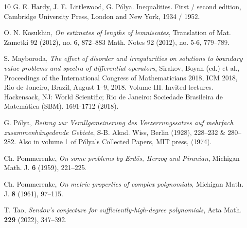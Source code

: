 \documentclass[12pt]{amsart}
\begin{document}
\begin{thebibliography}{10}
G. E. Hardy, J. E. Littlewood, G. P\'olya. Inequalities. First / second edition, Cambridge University Press, London and New York, 1934 / 1952.

O. N. Kosukhin, \emph{On estimates of lengths of lemniscates},
Translation of Mat. Zametki 92 (2012), no. 6, 872--883
Math. Notes 92 (2012), no. 5-6, 779--789.



S. Mayboroda, \emph{The effect of disorder and irregularities on solutions to boundary value problems and spectra of differential operators}, Sirakov, Boyan (ed.) et al., Proceedings of the International Congress of Mathematicians 2018, ICM 2018, Rio de Janeiro, Brazil, August 1--9, 2018. Volume III. Invited lectures. Hackensack, NJ: World Scientific; Rio de Janeiro: Sociedade Brasileira de Matem\'atica (SBM). 1691-1712 (2018).

G. P\'olya, \emph{Beitrag zur Verallgemeinerung des Verzerrungssatzes auf mehrfach zusammenh\"angedende Gebiete}, S-B. Akad. Wiss, Berlin (1928), 228--232 \& 280--282. Also in volume 1 of P\'olya's Collected Papers, MIT press, (1974).

Ch. Pommerenke, \emph{On some problems by Erd\H{o}s, Herzog and Piranian}, Michigan Math. J. \textbf{6} (1959), 221--225.

Ch. Pommerenke, \emph{On metric properties of complex polynomials}, Michigan Math. J. \textbf{8} (1961), 97--115.

T. Tao, \emph{Sendov's conjecture for sufficiently-high-degree polynomials}, Acta Math. \textbf{229} (2022), 347--392.




\end{thebibliography}
\end{document}
